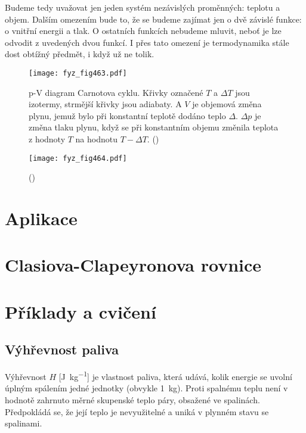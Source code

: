     Budeme tedy uvažovat jen jeden systém nezávislých proměnných: teplotu a objem. Dalším
    omezením bude to, že se budeme zajímat jen o dvě závislé funkce: o vnitřní energii a tlak. O
    ostatních funkcích nebudeme mluvit, neboť je lze odvodit z uvedených dvou funkcí. I přes tato
    omezení je termodynamika stále dost obtížný předmět, i když už ne tolik.

    \begin{figure}[ht!] %
      \centering
      \texttt{[image: fyz\_fig463.pdf]}
      \caption{p-V diagram Carnotova cyklu. Křivky označené \(T\) a \(\Delta T\) jsou izotermy,
               strmější křivky jsou adiabaty. A \(V\) je objemová změna plynu, jemuž bylo při
               konstantní teplotě dodáno teplo \(\Delta\). \(\Delta p\) je změna tlaku plynu, když
               se při konstantním objemu změnila teplota z hodnoty \(T\) na hodnotu \(T - \Delta
               T\). (\cite[s.~615]{Feynman01})}
      \label{fyz:fig463}
    \end{figure}

    \begin{figure}[ht!] %
      \centering
      \texttt{[image: fyz\_fig464.pdf]}
      \caption{ 
               (\cite[s.~616]{Feynman01})}
      \label{fyz:fig464}
    \end{figure}

  \section{Aplikace}\label{fyz:IchapXLVsecII}
  \section{Clasiova-Clapeyronova rovnice}\label{fyz:IchapXLVsecIII}
  \section{Příklady a cvičení}\label{fyz:IchapXLVsecIV}
    \subsection{Výhřevnost paliva}\label{fyz:IchapXLVsecIVssecI}
      Výhřevnost \(H\) [\si{\joule\per\kg}] je vlastnost paliva, která udává, kolik energie se
      uvolní úplným spálením jedné jednotky (obvykle \SI{1}{\kg}). Proti spalnému teplu není v
      hodnotě zahrnuto měrné skupenské teplo páry, obsažené ve spalinách. Předpokládá se, že její
      teplo je nevyužitelné a uniká v plynném stavu se spalinami.

